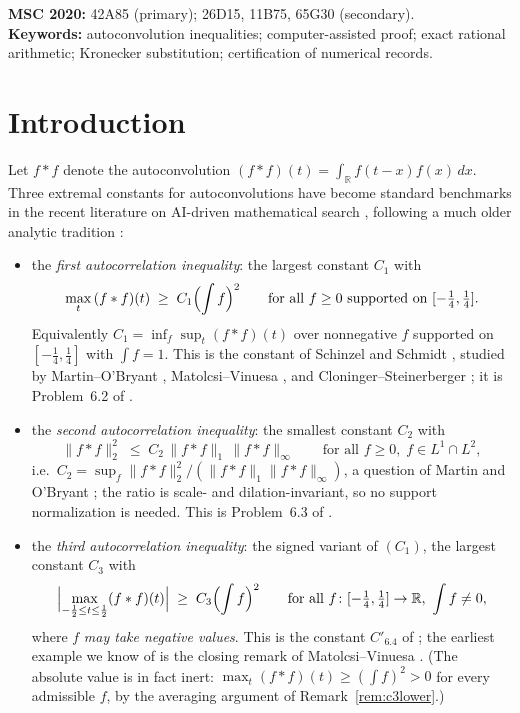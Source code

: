 \documentclass[11pt]{article}
\theoremstyle{remark}
\newcommand{\RR}{\mathbb{R}}
\newcommand{\supnorm}[1]{\lVert #1 \rVert_\infty}
\newcommand{\onenorm}[1]{\lVert #1 \rVert_1}
\newcommand{\twonorm}[1]{\lVert #1 \rVert_2}
\begin{document}
\medskip
\noindent\textbf{MSC 2020:} 42A85 (primary); 26D15, 11B75, 65G30
(secondary).\\
\textbf{Keywords:} autoconvolution inequalities; computer-assisted proof;
exact rational arithmetic; Kronecker substitution; certification of numerical
records.

\section{Introduction}\label{sec:intro}

Let $f * f$ denote the autoconvolution
$(f*f)(t) = \int_\RR f(t-x) f(x)\,dx$. Three extremal constants for
autoconvolutions have become standard
benchmarks in the recent literature on AI-driven mathematical search
\cite{AlphaEvolve25,MathScale25,ThetaEvolve25,TTT26,SimpleTES26}, following a
much older analytic tradition
\cite{SS02,MO09,MV10,CS17}:

\begin{itemize}
\item[$(C_1)$] the \emph{first autocorrelation inequality}: the largest
constant $C_1$ with
\[
\max_{t}\, (f*f)(t) \;\ge\; C_1 \Bigl(\int f\Bigr)^{2}
\qquad\text{for all } f \ge 0 \text{ supported on } [-\tfrac14,\tfrac14].
\]
Equivalently $C_1 = \inf_f \sup_t (f*f)(t)$ over nonnegative $f$ supported on
$[-\tfrac14,\tfrac14]$ with $\int f = 1$. This is the constant of Schinzel
and Schmidt \cite{SS02}, studied by Martin--O'Bryant \cite{MO09},
Matolcsi--Vinuesa \cite{MV10}, and Cloninger--Steinerberger \cite{CS17}; it
is Problem~6.2 of \cite{MathScale25}.
\item[$(C_2)$] the \emph{second autocorrelation inequality}: the smallest
constant $C_2$ with
\[
\twonorm{f*f}^{2} \;\le\; C_2\, \onenorm{f*f}\, \supnorm{f*f}
\qquad\text{for all } f \ge 0,\; f \in L^1 \cap L^2 ,
\]
i.e.\ $C_2 = \sup_f \twonorm{f*f}^2/(\onenorm{f*f} \supnorm{f*f})$, a
question of Martin and O'Bryant \cite{MO09}; the ratio is scale- and
dilation-invariant, so no support normalization is needed. This is
Problem~6.3 of \cite{MathScale25}.
\item[$(C_3)$] the \emph{third autocorrelation inequality}: the signed
variant of $(C_1)$, the largest constant $C_3$ with
\[
\Bigl|\max_{-\frac12 \le t \le \frac12} (f*f)(t)\Bigr| \;\ge\;
C_3 \Bigl(\int f\Bigr)^{2}
\qquad\text{for all } f\colon [-\tfrac14,\tfrac14] \to \RR,\ \int f \neq 0 ,
\]
where $f$ \emph{may take negative values}. This is the constant
$C'_{6.4}$ of \cite[Problem 6.4(b)]{MathScale25}; the earliest example we
know of is the closing remark of Matolcsi--Vinuesa \cite{MV10}. (The
absolute value is in fact inert: $\max_t (f*f)(t) \ge (\int f)^2 > 0$ for
every admissible $f$, by the averaging argument of
Remark~\ref{rem:c3lower}.)
\end{itemize}
\end{document}
